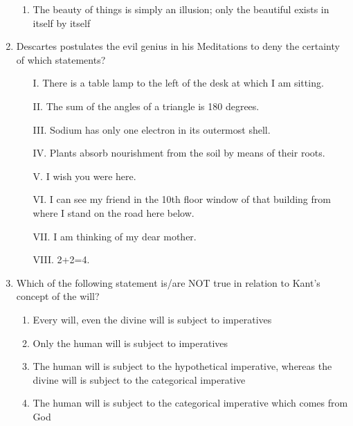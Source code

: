 \documentclass[12pt]{article}
\theoremstyle{remark}
\begin{document}
\begin{enumerate}
\begin{enumerate}
    \item The beauty of things is simply an illusion; only the beautiful exists in itself by itself 
\end{enumerate}
\hfill{}
\item Descartes postulates the evil genius in his Meditations to deny the certainty of which statements?
\begin{enumerate}
    \item[I.] There is a table lamp to the left of the desk at which I am sitting.
    \item[II.] The sum of the angles of a triangle is 180 degrees. 
    \item[III.] Sodium has only one electron in its outermost shell.
    \item[IV.] Plants absorb nourishment from the soil by means of their roots.
    \item[V.] I wish you were here.
    \item[VI.] I can see my friend in the 10th floor window of that building from where I stand on the road here below.
    \item[VII.] I am thinking of my dear mother.
    \item[VIII.] 2+2=4.
\end{enumerate}
\begin{enumerate}
\end{enumerate}
\hfill{}
\item Which of the following statement is/are NOT true in relation to Kant’s concept of the will?
\begin{enumerate}
    \item Every will, even the divine will is subject to imperatives
    \item Only the human will is subject to imperatives
    \item The human will is subject to the hypothetical imperative, whereas the divine will is subject to the categorical imperative
    \item The human will is subject to the categorical imperative which comes from God

\end{enumerate}
\end{enumerate}
\end{document}
